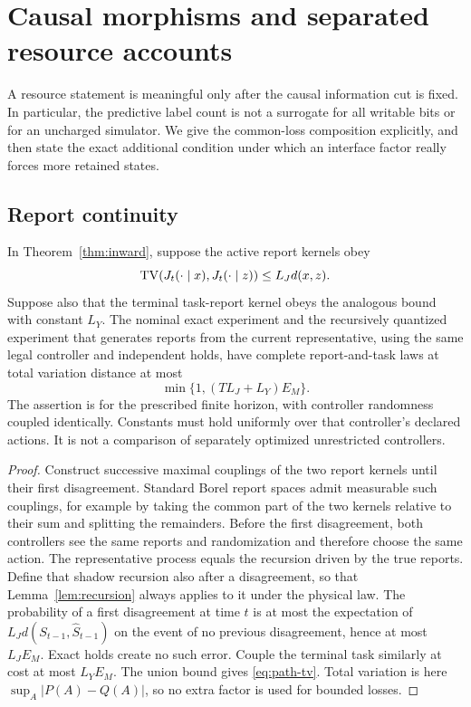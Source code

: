 \section{Causal morphisms and separated resource accounts}\label{sec:resources}
A resource statement is meaningful only after the causal information cut is fixed. In particular, the predictive label count is not a surrogate for all writable bits or for an uncharged simulator. We give the common-loss composition explicitly, and then state the exact additional condition under which an interface factor really forces more retained states.

\subsection{Report continuity}
\begin{proposition}\label{prop:report}
In Theorem~\ref{thm:inward}, suppose the active report kernels obey
\[
 \operatorname{TV}(J_t(\cdot\mid x),J_t(\cdot\mid z))\le L_Jd(x,z).
\]
Suppose also that the terminal task-report kernel obeys the analogous bound with constant $L_Y$. The nominal exact experiment and the recursively quantized experiment that generates reports from the current representative, using the same legal controller and independent holds, have complete report-and-task laws at total variation distance at most
\begin{equation}\label{eq:path-tv}
 \min\{1,(TL_J+L_Y)E_M\}.
\end{equation}
The assertion is for the prescribed finite horizon, with controller randomness coupled identically. Constants must hold uniformly over that controller's declared actions. It is not a comparison of separately optimized unrestricted controllers.
\end{proposition}
\begin{proof}
Construct successive maximal couplings of the two report kernels until their first disagreement. Standard Borel report spaces admit measurable such couplings, for example by taking the common part of the two kernels relative to their sum and splitting the remainders. Before the first disagreement, both controllers see the same reports and randomization and therefore choose the same action. The representative process equals the recursion driven by the true reports. Define that shadow recursion also after a disagreement, so that Lemma~\ref{lem:recursion} always applies to it under the physical law. The probability of a first disagreement at time $t$ is at most the expectation of $L_Jd(S_{t-1},\widehat S_{t-1})$ on the event of no previous disagreement, hence at most $L_JE_M$. Exact holds create no such error. Couple the terminal task similarly at cost at most $L_YE_M$. The union bound gives \eqref{eq:path-tv}. Total variation is here $\sup_A|P(A)-Q(A)|$, so no extra factor is used for bounded losses.
\end{proof}

